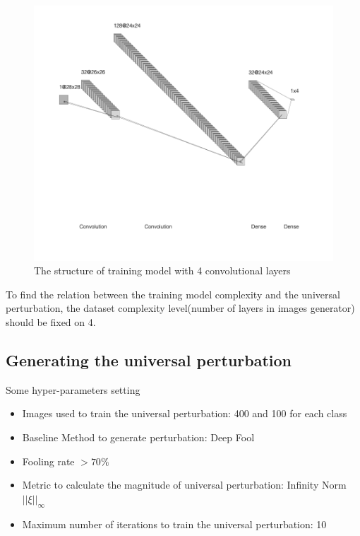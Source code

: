 \documentclass{article}
\begin{document}
\begin{figure}[h]
    \centering
    \includegraphics[width=1\linewidth]{training_model_structure.png}
    \caption{\small The structure of training model with 4 convolutional layers}
    \label{fig:training_model_structure}
\end{figure}

To find the relation between the training model complexity and the universal perturbation, the dataset complexity level(number of layers in images generator) should be fixed on 4.

\subsection{Generating the universal perturbation}

Some hyper-parameters setting
\begin{itemize}
    \item Images used to train the universal perturbation: 400 and 100 for each class
    \item Baseline Method to generate perturbation: Deep Fool
    \item Fooling rate $> 70\%$
    \item Metric to calculate the magnitude of universal perturbation: Infinity Norm $||\xi||_\infty$
    \item Maximum number of iterations to train the universal perturbation: 10
\end{itemize}
\end{document}
